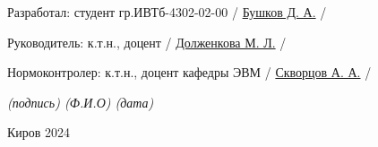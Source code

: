 \begin{titlepage}
	\newcommand{\ulinesize}{2.5cm}

	\large
	\vspace{1cm}
	\noindent
	Разработал: студент гр.ИВТб-4302-02-00 \hfill \uline{\hspace{\ulinesize}}
	/ \uline{Бушков Д. А.} / \hspace{8mm} \uline{\hspace{\ulinesize}}

	\vspace{1.5cm}
	\noindent
	Руководитель: к.т.н., доцент
	\hfill \uline{\hspace{\ulinesize}}
	/ \uline{Долженкова М. Л.} / \uline{\hspace{\ulinesize}}

	\vspace{1.5cm}
	\noindent
	Нормоконтролер: к.т.н., доцент кафедры ЭВМ
	\hfill \uline{\hspace{\ulinesize}}
	/ \uline{Скворцов А. А.} / \hspace{4mm} \uline{\hspace{\ulinesize}}

	{
		\small
		\itshape
		\vspace{1mm}
		\hfill
		(подпись) \hspace{1.6cm} (Ф.И.О) \hspace{2.2cm} (дата) \hspace{0.8cm}
	}

	\begin{center}
		\vfill
		Киров 2024
		\vspace{1cm}
	\end{center}


\end{titlepage}
